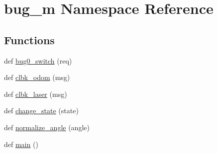 \hypertarget{namespacebug__m}{}\section{bug\+\_\+m Namespace Reference}
\label{namespacebug__m}
\subsection*{Functions}
\begin{DoxyCompactItemize}
\item 
def \hyperlink{namespacebug__m_ab3e1fed8fba27ac54493712a95fdaafa}{bug0\+\_\+switch} (req)
\item 
def \hyperlink{namespacebug__m_a27cfd2a326148157d3e5e0affbe763f3}{clbk\+\_\+odom} (msg)
\item 
def \hyperlink{namespacebug__m_a6ab3d92b5b6ea12eaa52bf21cfa111f1}{clbk\+\_\+laser} (msg)
\item 
def \hyperlink{namespacebug__m_aca19305feae5c5489e7452e921fcbd9c}{change\+\_\+state} (state)
\item 
def \hyperlink{namespacebug__m_a6547c5ebcd1d3aa3e104a5b573e47862}{normalize\+\_\+angle} (angle)
\item 
def \hyperlink{namespacebug__m_a357589ad533151302b9fa9a893833382}{main} ()
\end{DoxyCompactItemize}
